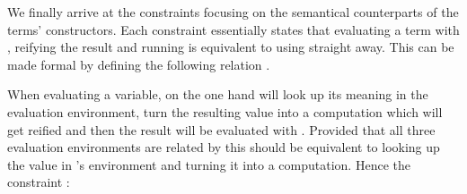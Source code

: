 \begin{agdasnippet}
\addtolength{\leftskip}{\parindent}
\end{agdasnippet}
We finally arrive at the constraints focusing on the semantical counterparts
of the terms' constructors. Each constraint essentially states that evaluating
a term with , reifying the result and running  is equivalent to
using  straight away. This can be made formal by defining the following
relation .

\begin{agdasnippet}
\addtolength{\leftskip}{\parindent}
\end{agdasnippet}
When evaluating a variable, on the one hand 
will look up its meaning in the evaluation environment, turn the resulting value into
a computation which will get reified and then the result will be evaluated with .
Provided that all three evaluation environments are related by  this should
be equivalent to looking up the value in 's environment and turning it into a
computation. Hence the constraint :

